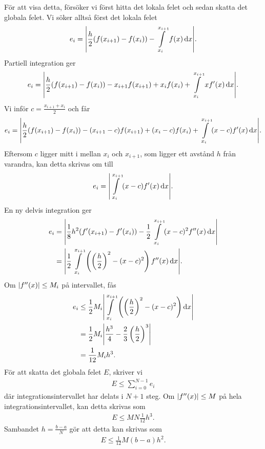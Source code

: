 För att visa detta, försöker vi först hitta det lokala felet och sedan skatta det globala felet. Vi söker alltså först det lokala felet
\begin{align*}
	e_{i} = \abs{\frac{h}{2}(f(x_{i + 1}) - f(x_{i})) - \int\limits_{x_{i}}^{x_{i + 1}}f(x)\dd{x}}.
\end{align*}
Partiell integration ger
\begin{align*}
	e_{i} = \abs{\frac{h}{2}(f(x_{i + 1}) - f(x_{i})) - x_{i + 1}f(x_{i + 1}) + x_{i}f(x_{i}) + \int\limits_{x_{i}}^{x_{i + 1}}xf'(x)\dd{x}}.
\end{align*}
Vi inför $c = \frac{x_{i + 1} + x_{i}}{2}$ och får
\begin{align*}
	e_{i} = \abs{\frac{h}{2}(f(x_{i + 1}) - f(x_{i})) - (x_{i + 1} - c)f(x_{i + 1}) + (x_{i} - c)f(x_{i}) + \int\limits_{x_{i}}^{x_{i + 1}}(x - c)f'(x)\dd{x}}.
\end{align*}
Eftersom $c$ ligger mitt i mellan $x_{i}$ och $x_{i + 1}$, som ligger ett avstånd $h$ från varandra, kan detta skrivas om till
\begin{align*}
	e_{i} = \abs{\int\limits_{x_{i}}^{x_{i + 1}}(x - c)f'(x)\dd{x}}.
\end{align*}
En ny delvis integration ger
\begin{align*}
	e_{i} &= \abs{\frac{1}{8}h^{2}(f'(x_{i + 1}) - f'(x_{i})) - \frac{1}{2}\int\limits_{x_{i}}^{x_{i + 1}}(x - c)^{2}f''(x)\dd{x}} \\
	      &= \abs{\frac{1}{2}\int\limits_{x_{i}}^{x_{i + 1}}\left(\left(\frac{h}{2}\right)^{2} - (x - c)^{2}\right)f''(x)\dd{x}}.
\end{align*}
Om $\abs{f''(x)} \leq M_{i}$ på intervallet, fås
\begin{align*}
	e_{i} &\leq \frac{1}{2}M_{i}\abs{\int\limits_{x_{i}}^{x_{i + 1}}\left(\left(\frac{h}{2}\right)^{2} - (x - c)^{2}\right)\dd{x}} \\
	      &= \frac{1}{2}M_{i}\abs{\frac{h^{3}}{4} - \frac{2}{3}\left(\frac{h}{2}\right)^{3}} \\
	      &= \frac{1}{12}M_{i}h^{3}.
\end{align*}
För att skatta det globala felet $E$, skriver vi
\begin{align*}
	E \leq \sum\limits_{i = 0}^{N - 1}e_{i}
\end{align*}
där integrationsintervallet har delats i $N + 1$ steg. Om $\abs{f''(x)} \leq M$ på hela integrationsintervallet, kan detta skrivas som
\begin{align*}
	E \leq MN\frac{1}{12}h^{3}.
\end{align*}
Sambandet $h = \frac{b - a}{N}$ gör att detta kan skrivas som
\begin{align*}
	E \leq \frac{1}{12}M(b - a)h^{2}.
\end{align*}

